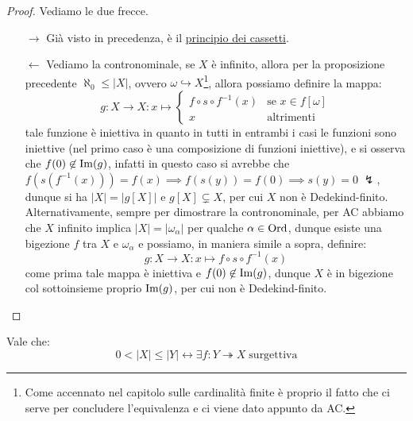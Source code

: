 \begin{proof}
	Vediamo le due frecce.
	\begin{itemize}
		\item[$\boxed{\rightarrow}$] Già visto in precedenza, è il \hyperref[cassetti]{principio dei cassetti}.
		\item[$\boxed{\leftarrow}$] Vediamo la contronominale, se $X$ è infinito, allora per la proposizione precedente $\aleph_0 \leq |X|$, ovvero $\omega \hookrightarrow X$\footnote{Come accennato nel capitolo sulle cardinalità finite è proprio il fatto che ci serve per concludere l'equivalenza e ci viene dato appunto da AC.}, allora possiamo definire la mappa:
		\[ g : X \rightarrow X : x \mapsto \begin{cases}
			f \circ s \circ f^{-1} (x) &\text{se $x \in f[\omega]$} \\
			x &\text{altrimenti}
		\end{cases}
			\]
		tale funzione è iniettiva in quanto in tutti in entrambi i casi le funzioni sono iniettive (nel primo caso è una composizione di funzioni iniettive), e si osserva che $f(0) \not \in \operatorname{Im}(g)$, infatti in questo caso si avrebbe che $f(s(f^{-1}(x))) = f(x) \implies f(s(y)) = f(0) \implies s(y) = 0 \; \lightning$, dunque si ha $|X| = |g[X]|$ e $g[X] \subsetneq X$, per cui $X$ non è Dedekind-finito.\\
		Alternativamente, sempre per dimostrare la contronominale, per AC abbiamo che $X$ infinito implica $|X| = |\omega_\alpha|$ per qualche $\alpha \in \operatorname{Ord}$, dunque esiste una bigezione $f$ tra $X$ e $\omega_\alpha$ e possiamo, in maniera simile a sopra, definire:
		\[ g : X \to X : x \mapsto f \circ s \circ f^{-1}(x)
			\]
		come prima tale mappa è iniettiva e $f(0) \not \in \operatorname{Im}(g)$, dunque $X$ è in bigezione col sottoinsieme proprio $\operatorname{Im}(g)$, per cui non è Dedekind-finito.
	\end{itemize}
\end{proof}

\begin{proposition}
	Vale che:
	\[ 0 < |X| \leq |Y| \leftrightarrow \exists f : Y \twoheadrightarrow X \; \text{surgettiva}
		\]
\end{proposition}

